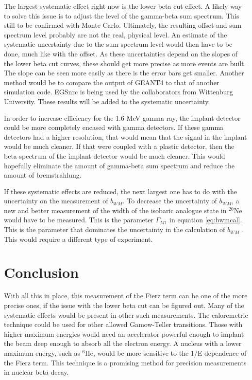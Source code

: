 \documentclass[../MaxHughesThesis.tex]{subfiles}
\begin{document}
The largest systematic effect right now is the lower beta cut effect. 
A likely way to solve this issue is to adjust the level of the gamma-beta sum spectrum.
This still to be confirmed with Monte Carlo.
Ultimately, the resulting offset and sum spectrum level probably are not the real, physical level.
An estimate of the systematic uncertainty due to the sum spectrum level would then have to be done, much like with the offset.
As these uncertainties depend on the slopes of the lower beta cut curves, these should get more precise as more events are built.
The slope can be seen more easily as there is the error bars get smaller.
Another method would be to compare the output of GEANT4 to that of another simulation code.
EGSnrc is being used by the collaborators from Wittenburg University. 
These results will be added to the systematic uncertainty.

In order to increase efficiency for the 1.6 MeV gamma ray, the implant detector could be more completely encased with gamma detectors.
If these gamma detectors had a higher resolution, that would mean that the signal in the implant would be much cleaner.
If that were coupled with a plastic detector, then the beta spectrum of the implant detector would be much cleaner.
This would hopefully eliminate the amount of gamma-beta sum spectrum and reduce the amount of bremstrahlung.

If these systematic effects are reduced, the next largest one has to do with the uncertainty on the measurement of $b_{WM}$.
To decrease the uncertainty of $b_{WM}$,  a new and better measurement of the width of the isobaric analogue state in $^{20}$Ne would have to be measured.
This is the parameter $\Gamma_{M1}$ in equation \ref{eq:bwmcal}.
This is the parameter that dominates the uncertainty in  the calculation of $b_{WM}$ \cite{Min11}.
This would require a different type of experiment.

\section{Conclusion}
With all this in place, this measurement of the Fierz term can be one of the more precise ones, if the issue with the lower beta cut can be figured out.
Many of the systematic effects would be present in other such measurements.
The caloremetric technique could be used for other allowed Gamow-Teller transitions.
Those with higher maximum energies would need an accelerator powerful enough to implant the beam deep enough to absorb all the electron energy.
A nucleus with a lower maximum energy, such as $^{6}$He, would be more sensitive to the 1/E dependence of the Fierz term. 
This technique is a promising method for precision measurements in nuclear beta decay.
\end{document}

